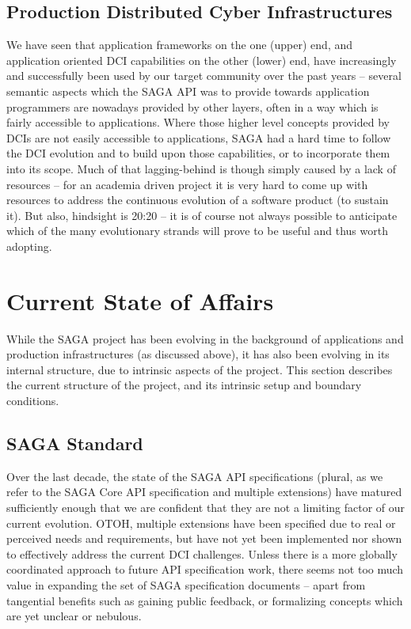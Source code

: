 \documentclass{article}
\newcommand{\B}[1]{\textbf{#1}}
\newcommand{\todo}[1]{{\textcolor{red}{\B{TODO:} #1 }}}
\begin{document}
 \subsection{Production Distributed Cyber Infrastructures}

  We have seen that application frameworks on the one (upper) end, and
  application oriented DCI capabilities on the other (lower) end, have
  increasingly and successfully been used by our target community over
  the past years -- several semantic aspects which the SAGA API was to
  provide towards application programmers are nowadays provided by
  other layers, often in a way which is fairly accessible to
  applications.  Where those higher level concepts provided by DCIs
  are not easily accessible to applications, SAGA had a hard time to
  follow the DCI evolution and to build upon those capabilities, or to
  incorporate them into its scope.  Much of that lagging-behind is
  though simply caused by a lack of resources -- for an academia
  driven project it is very hard to come up with resources to address
  the continuous evolution of a software product (to sustain it).  But
  also, hindsight is 20:20 -- it is of course not always possible to
  anticipate which of the many evolutionary strands will prove to be
  useful and thus worth adopting.


%


\section{Current State of Affairs}
\label{sec:state}


 While the SAGA project has been evolving in the background of
 applications and production infrastructures (as discussed above), it
 has also been evolving in its internal structure, due to intrinsic
 aspects of the project.  This section describes the current structure
 of the project, and its intrinsic setup and boundary conditions.



\subsection{SAGA Standard}

  Over the last decade, the state of the SAGA API specifications
  (plural, as we refer to the SAGA Core API specification and multiple
  extensions) have matured sufficiently enough that we are confident
  that they are not a limiting factor of our current evolution.  OTOH,
  multiple extensions have been specified due to real or perceived
  needs and requirements, but have not yet been implemented nor shown
  to effectively address the current DCI challenges.  Unless there is
  a more globally coordinated approach to future API specification
  work, there seems not too much value in expanding the set of SAGA
  specification documents -- apart from tangential benefits such as
  gaining public feedback, or formalizing concepts which are yet
  unclear or nebulous.
\end{document}
